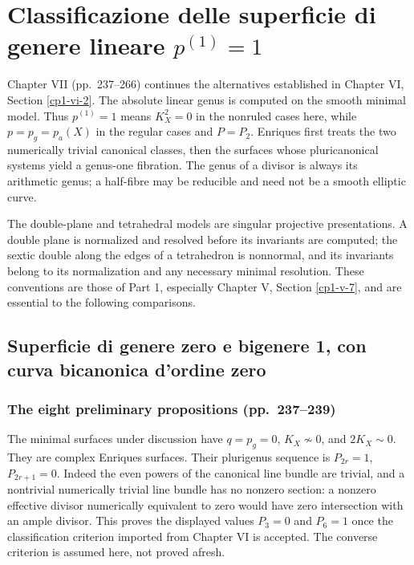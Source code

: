 \chapter[Superficie di genere lineare uno]{Classificazione delle superficie di genere lineare \texorpdfstring{$p^{(1)}=1$}{p(1) = 1}}
\label{cp2-ch-vii}

Chapter VII (pp.~237--266) continues the alternatives established in Chapter VI, Section \ref{cp1-vi-2}. The absolute linear genus is computed on the smooth minimal model. Thus \(p^{(1)}=1\) means \(K_X^2=0\) in the nonruled cases here, while \(p=p_g=p_a(X)\) in the regular cases and \(P=P_2\). Enriques first treats the two numerically trivial canonical classes, then the surfaces whose pluricanonical systems yield a genus-one fibration. The genus of a divisor is always its arithmetic genus; a half-fibre may be reducible and need not be a smooth elliptic curve.

The double-plane and tetrahedral models are singular projective presentations. A double plane is normalized and resolved before its invariants are computed; the sextic double along the edges of a tetrahedron is nonnormal, and its invariants belong to its normalization and any necessary minimal resolution. These conventions are those of Part 1, especially Chapter V, Section \ref{cp1-v-7}, and are essential to the following comparisons.

\section[Superficie di genere zero e bigenere uno]{Superficie di genere zero e bigenere 1, con curva bicanonica d'ordine zero}\label{cp2-vii-1}

\subsection{The eight preliminary propositions (pp.~237--239)}\label{cp2-vii-1-1}

The minimal surfaces under discussion have \(q=p_g=0\), \(K_X\not\sim0\), and \(2K_X\sim0\). They are complex Enriques surfaces. Their plurigenus sequence is \(P_{2r}=1\), \(P_{2r+1}=0\). Indeed the even powers of the canonical line bundle are trivial, and a nontrivial numerically trivial line bundle has no nonzero section: a nonzero effective divisor numerically equivalent to zero would have zero intersection with an ample divisor. This proves the displayed values \(P_3=0\) and \(P_6=1\) once the classification criterion imported from Chapter VI is accepted. The converse criterion is assumed here, not proved afresh.

